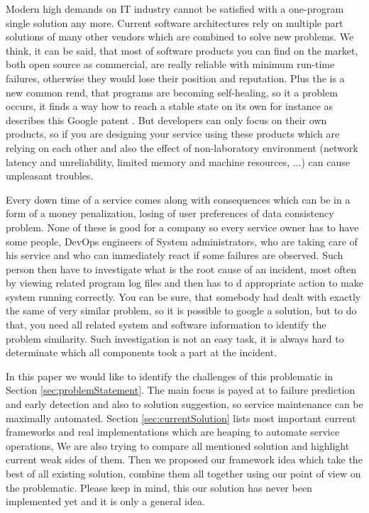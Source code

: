 Modern high demands on IT industry cannot be satisfied with a one-program single solution any more. Current software architectures rely on multiple part solutions of many other vendors which are combined to solve new problems. We think, it can be said, that most of software products you can find on the market, both open source as commercial, are really reliable with minimum run-time failures, otherwise they would lose their position and reputation. Plus the is a new common rend, that programs are becoming self-healing, so it a problem occurs, it finds a way how to reach a stable state on its own for instance as describes this Google patent \cite{khan2011self}. But developers can only focus on their own products, so if you are designing your service using these products which are relying on each other and also the effect of non-laboratory environment (network latency and unreliability, limited memory and machine resources, ...) can cause unpleasant troubles.

Every down time of a service comes along with consequences which can be in a form of a money penalization, losing of user preferences of data consistency problem. None of these is good for a company so every service owner has to have some people, DevOps engineers of System administrators, who are taking care of his service and who can immediately react if some failures are observed. Such person then have to investigate what is the root cause of an incident, most often by viewing related program log files and then has to d appropriate action to make system running correctly. You can be sure, that somebody had dealt with exactly the same of very similar problem, so it is possible to google a solution, but to do that, you need all related system and software information to identify the problem similarity. Such investigation is not an easy task, it is always hard to determinate which all components took a part at the incident.

In this paper we would like to identify the challenges of this problematic in Section \ref{sec:problemStatement}. The main focus is payed at to failure prediction and early detection and also to solution suggestion, so service maintenance can be maximally automated. Section \ref{sec:currentSolution} lists most important current frameworks and real implementations which are heaping to automate service operations, We are also trying to compare all mentioned solution and highlight current weak sides of them. Then we proposed our framework idea which take the best of all existing solution, combine them all together using our point of view on the problematic. Please keep in mind, this our solution has never been implemented yet and it is only a general idea.
